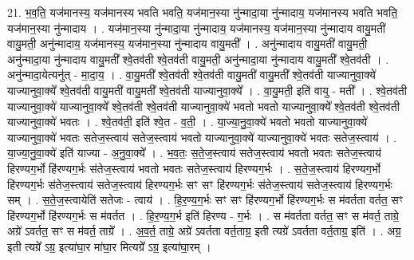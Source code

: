 \documentclass[17pt]{extarticle}
\begin{document}
21. भ॒व॒ति॒ यज॑मानस्य॒ यज॑मानस्य भवति भवति॒ यज॑मान॒स्या नु॑न्मादा॒या नु॑न्मादाय॒ यज॑मानस्य भवति भवति॒ यज॑मान॒स्या नु॑न्मादाय । . यज॑मान॒स्या नु॑न्मादा॒या नु॑न्मादाय॒ यज॑मानस्य॒ यज॑मान॒स्या नु॑न्मादाय वायु॒मती॑ 
वायु॒मती॒ अनु॑न्मादाय॒ यज॑मानस्य॒ यज॑मान॒स्या नु॑न्मादाय वायु॒मती᳚ । . अनु॑न्मादाय वायु॒मती॑ वायु॒मती॒ अनु॑न्मादा॒या नु॑न्मादाय वायु॒मती᳚ श्वे॒तव॑ती श्वे॒तव॑ती 
वायु॒मती॒ अनु॑न्मादा॒या नु॑न्मादाय वायु॒मती᳚ श्वे॒तव॑ती । . अनु॑न्मादा॒येत्यनु॑त् - मा॒दा॒य॒ । . वा॒यु॒मती᳚ श्वे॒तव॑ती श्वे॒तव॑ती वायु॒मती॑ वायु॒मती᳚ श्वे॒तव॑ती याज्यानुवा॒क्ये॑ याज्यानुवा॒क्ये᳚ श्वे॒तव॑ती वायु॒मती॑ वायु॒मती᳚ श्वे॒तव॑ती याज्यानुवा॒क्ये᳚ । . वा॒यु॒मती॒ इति॑ वायु - मती᳚ । . श्वे॒तव॑ती याज्यानुवा॒क्ये॑ याज्यानुवा॒क्ये᳚ श्वे॒तव॑ती श्वे॒तव॑ती याज्यानुवा॒क्ये॑ भवतो भवतो याज्यानुवा॒क्ये᳚ श्वे॒तव॑ती श्वे॒तव॑ती याज्यानुवा॒क्ये॑ भवतः । . श्वे॒तव॑ती॒ इति॑ श्वे॒त - व॒ती॒ । . या॒ज्या॒नु॒वा॒क्ये॑ भवतो भवतो याज्यानुवा॒क्ये॑ याज्यानुवा॒क्ये॑ भवतः सतेज॒स्त्वाय॑ सतेज॒स्त्वाय॑ भवतो याज्यानुवा॒क्ये॑ याज्यानुवा॒क्ये॑ भवतः सतेज॒स्त्वाय॑ । . या॒ज्या॒नु॒वा॒क्ये॑ इति॑ याज्या - अ॒नु॒वा॒क्ये᳚ । . भ॒व॒तः॒ स॒ते॒ज॒स्त्वाय॑ सतेज॒स्त्वाय॑ भवतो भवतः सतेज॒स्त्वाय॑ हिरण्यग॒र्भो हि॑रण्यग॒र्भः स॑तेज॒स्त्वाय॑ भवतो भवतः सतेज॒स्त्वाय॑ हिरण्यग॒र्भः । . स॒ते॒ज॒स्त्वाय॑ हिरण्यग॒र्भो हि॑रण्यग॒र्भः स॑तेज॒स्त्वाय॑ सतेज॒स्त्वाय॑ हिरण्यग॒र्भः सꣳ सꣳ हि॑रण्यग॒र्भः स॑तेज॒स्त्वाय॑ सतेज॒स्त्वाय॑ हिरण्यग॒र्भः सम् । . स॒ते॒ज॒स्त्वायेति॑ सतेजः - त्वाय॑ । . हि॒र॒ण्य॒ग॒र्भः सꣳ सꣳ हि॑रण्यग॒र्भो हि॑रण्यग॒र्भः स म॑वर्तता वर्तत॒ सꣳ हि॑रण्यग॒र्भो हि॑रण्यग॒र्भः स म॑वर्तत । . हि॒र॒ण्य॒ग॒र्भ इति॑ हिरण्य - ग॒र्भः । . स म॑वर्तता वर्तत॒ सꣳ स म॑वर्त॒ ताग्रे॒ अग्रे॑ ऽवर्तत॒ सꣳ स म॑वर्त॒ ताग्रे᳚ । . अ॒व॒र्त॒ ताग्रे॒ अग्रे॑ ऽवर्तता वर्त॒ताग्र॒ इती त्यग्रे॑ ऽवर्तता वर्त॒ताग्र॒ इति॑ । . अग्र॒ इती त्यग्रे᳚ ऽग्र॒ इत्या॑घा॒र मा॑घा॒र मित्यग्रे᳚ ऽग्र॒ इत्या॑घा॒रम् । \newline
\end{document}
